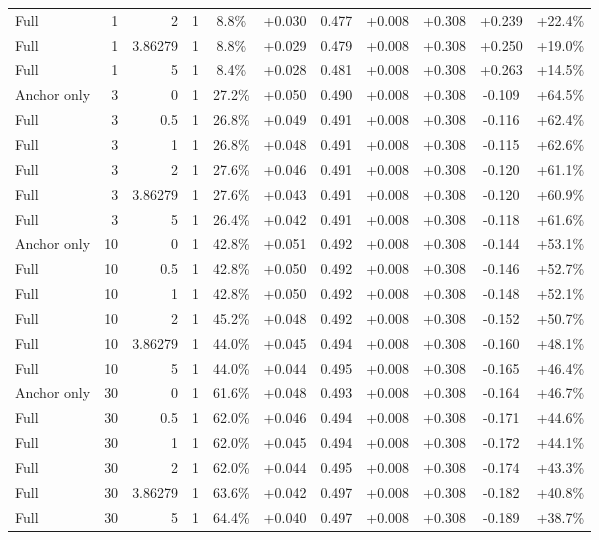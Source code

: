 \begin{table}[htbp]
\begin{tabular}{lrrrccccccc}
Full & 1 & 2 & 1 & 8.8\% & +0.030 & 0.477 & +0.008 & +0.308 & +0.239 & +22.4\% \\
Full & 1 & 3.86279 & 1 & 8.8\% & +0.029 & 0.479 & +0.008 & +0.308 & +0.250 & +19.0\% \\
Full & 1 & 5 & 1 & 8.4\% & +0.028 & 0.481 & +0.008 & +0.308 & +0.263 & +14.5\% \\
Anchor only & 3 & 0 & 1 & 27.2\% & +0.050 & 0.490 & +0.008 & +0.308 & -0.109 & +64.5\% \\
Full & 3 & 0.5 & 1 & 26.8\% & +0.049 & 0.491 & +0.008 & +0.308 & -0.116 & +62.4\% \\
Full & 3 & 1 & 1 & 26.8\% & +0.048 & 0.491 & +0.008 & +0.308 & -0.115 & +62.6\% \\
Full & 3 & 2 & 1 & 27.6\% & +0.046 & 0.491 & +0.008 & +0.308 & -0.120 & +61.1\% \\
Full & 3 & 3.86279 & 1 & 27.6\% & +0.043 & 0.491 & +0.008 & +0.308 & -0.120 & +60.9\% \\
Full & 3 & 5 & 1 & 26.4\% & +0.042 & 0.491 & +0.008 & +0.308 & -0.118 & +61.6\% \\
Anchor only & 10 & 0 & 1 & 42.8\% & +0.051 & 0.492 & +0.008 & +0.308 & -0.144 & +53.1\% \\
Full & 10 & 0.5 & 1 & 42.8\% & +0.050 & 0.492 & +0.008 & +0.308 & -0.146 & +52.7\% \\
Full & 10 & 1 & 1 & 42.8\% & +0.050 & 0.492 & +0.008 & +0.308 & -0.148 & +52.1\% \\
Full & 10 & 2 & 1 & 45.2\% & +0.048 & 0.492 & +0.008 & +0.308 & -0.152 & +50.7\% \\
Full & 10 & 3.86279 & 1 & 44.0\% & +0.045 & 0.494 & +0.008 & +0.308 & -0.160 & +48.1\% \\
Full & 10 & 5 & 1 & 44.0\% & +0.044 & 0.495 & +0.008 & +0.308 & -0.165 & +46.4\% \\
Anchor only & 30 & 0 & 1 & 61.6\% & +0.048 & 0.493 & +0.008 & +0.308 & -0.164 & +46.7\% \\
Full & 30 & 0.5 & 1 & 62.0\% & +0.046 & 0.494 & +0.008 & +0.308 & -0.171 & +44.6\% \\
Full & 30 & 1 & 1 & 62.0\% & +0.045 & 0.494 & +0.008 & +0.308 & -0.172 & +44.1\% \\
Full & 30 & 2 & 1 & 62.0\% & +0.044 & 0.495 & +0.008 & +0.308 & -0.174 & +43.3\% \\
Full & 30 & 3.86279 & 1 & 63.6\% & +0.042 & 0.497 & +0.008 & +0.308 & -0.182 & +40.8\% \\
Full & 30 & 5 & 1 & 64.4\% & +0.040 & 0.497 & +0.008 & +0.308 & -0.189 & +38.7\% \\

\end{tabular}
\end{table}
